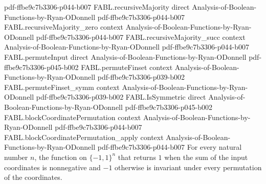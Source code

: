 \begin{theorem}
  {pdf-ffbe9c7b3306-p044-b007}
\proofstep
  {FABL.recursiveMajority}
  {direct}
  {Analysis-of-Boolean-Functions-by-Ryan-ODonnell}
  {pdf-ffbe9c7b3306-p044-b007}
\proofstep
  {FABL.recursiveMajority_zero}
  {context}
  {Analysis-of-Boolean-Functions-by-Ryan-ODonnell}
  {pdf-ffbe9c7b3306-p044-b007}
\proofstep
  {FABL.recursiveMajority_succ}
  {context}
  {Analysis-of-Boolean-Functions-by-Ryan-ODonnell}
  {pdf-ffbe9c7b3306-p044-b007}
\proofstep
  {FABL.permuteInput}
  {direct}
  {Analysis-of-Boolean-Functions-by-Ryan-ODonnell}
  {pdf-ffbe9c7b3306-p045-b002}
\proofstep
  {FABL.permuteFinset}
  {context}
  {Analysis-of-Boolean-Functions-by-Ryan-ODonnell}
  {pdf-ffbe9c7b3306-p039-b002}
\proofstep
  {FABL.permuteFinset_symm}
  {context}
  {Analysis-of-Boolean-Functions-by-Ryan-ODonnell}
  {pdf-ffbe9c7b3306-p039-b002}
\proofstep
  {FABL.IsSymmetric}
  {direct}
  {Analysis-of-Boolean-Functions-by-Ryan-ODonnell}
  {pdf-ffbe9c7b3306-p045-b002}
\proofstep
  {FABL.blockCoordinatePermutation}
  {context}
  {Analysis-of-Boolean-Functions-by-Ryan-ODonnell}
  {pdf-ffbe9c7b3306-p044-b007}
\proofstep
  {FABL.blockCoordinatePermutation_apply}
  {context}
  {Analysis-of-Boolean-Functions-by-Ryan-ODonnell}
  {pdf-ffbe9c7b3306-p044-b007}
For every natural number $n$, the function on $\{-1,1\}^n$ that returns $1$ when the
sum of the input coordinates is nonnegative and $-1$ otherwise is invariant under every
permutation of the coordinates.
\end{theorem}

